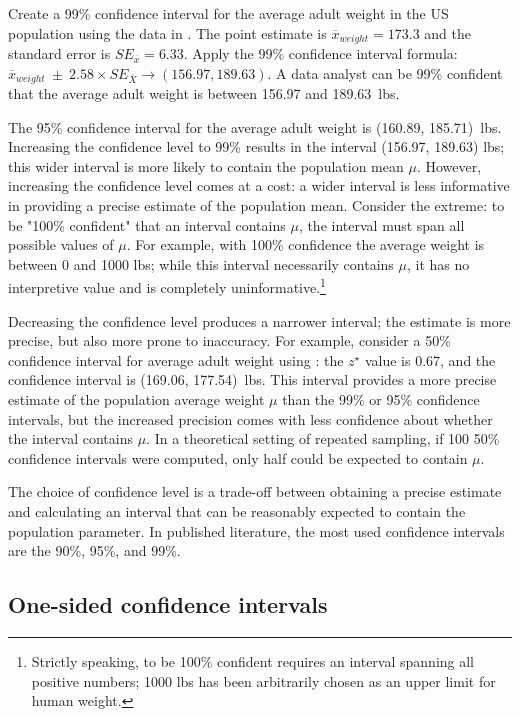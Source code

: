 \begin{example} {
    Create a 99\% confidence interval for the average adult weight in the US population using the data in . The point estimate is $\overline{x}_{weight} = 173.3$ and the standard error is $SE_{\overline{x}} = 6.33$.}
Apply the 99\% confidence interval formula: $\overline{x}_{weight}\ \pm\ 2.58 \times  SE_{\overline{X}} \rightarrow (156.97, 189.63)$. A data analyst can be 99\% confident that the average adult weight is between 156.97 and 189.63~lbs.
\end{example}

The 95\% confidence interval for the average adult weight is (160.89, 185.71)~lbs. Increasing the confidence level to 99\% results in the interval (156.97, 189.63) lbs; this wider interval is more likely to contain the population mean $\mu$. However, increasing the confidence level comes at a cost: a wider interval is less informative in providing a precise estimate of the population mean. Consider the extreme: to be "100\% confident" that an interval contains $\mu$, the interval must span all possible values of $\mu$. For example, with 100\% confidence the average weight is between 0 and 1000 lbs; while this interval necessarily contains $\mu$, it has no interpretive value and is completely uninformative.\footnote{Strictly speaking, to be 100\% confident requires an interval spanning all positive numbers; 1000 lbs has been arbitrarily chosen as an upper limit for human weight.} 

Decreasing the confidence level produces a narrower interval; the estimate is more precise, but also more prone to inaccuracy. For example, consider a 50\% confidence interval for average adult weight using : the $z^{\star}$ value is 0.67, and the confidence interval is (169.06, 177.54)~lbs. This interval provides a more precise estimate of the population average weight $\mu$ than the 99\% or 95\% confidence intervals, but the increased precision comes with less confidence about whether the interval contains $\mu$. In a theoretical setting of repeated sampling, if 100 50\% confidence intervals were computed, only half could be expected to contain $\mu$.

The choice of confidence level is a trade-off between obtaining a precise estimate and calculating an interval that can be reasonably expected to contain the population parameter. In published literature, the most used confidence intervals are the 90\%, 95\%, and 99\%. 

\subsection{One-sided confidence intervals}
\label{onesidedCIs}

